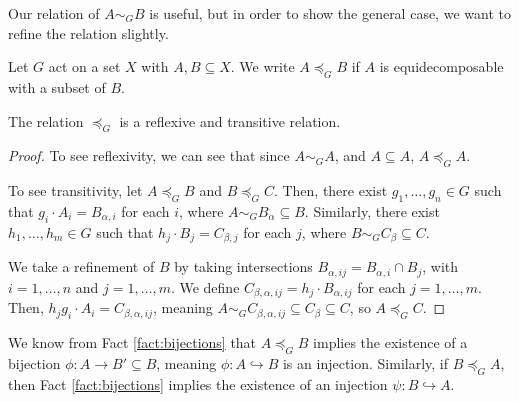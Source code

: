 Our relation of $A \sim_{G} B$ is useful, but in order to show the general case, we want to refine the relation slightly.
\begin{definition}
  Let $G$ act on a set $X$ with $A,B\subseteq X$. We write $A\preceq_{G}B$ if $A$ is equidecomposable with a subset of $B$.
\end{definition}
\begin{fact}\label{fact:preorder}
  The relation $\preceq_{G}$ is a reflexive and transitive relation.
\end{fact}
\begin{proof}
  To see reflexivity, we can see that since $A\sim_{G}A$, and $A\subseteq A$, $A\preceq_{G} A$.\newline

  To see transitivity, let $A\preceq_{G}B$ and $B\preceq_{G}C$. Then, there exist $g_1,\dots,g_n\in G$ such that $g_i\cdot A_i = B_{\alpha,i}$ for each $i$, where $A\sim_{G}B_{\alpha}\subseteq B$. Similarly, there exist $h_1,\dots,h_m\in G$ such that $h_j\cdot B_j= C_{\beta,j}$ for each $j$, where $B\sim_{G}C_{\beta}\subseteq C$.\newline

  We take a refinement of $B$ by taking intersections $B_{\alpha,ij} = B_{\alpha,i}\cap B_j$, with $i=1,\dots,n$ and $j = 1,\dots,m$. We define $C_{\beta,\alpha,ij} = h_j\cdot B_{\alpha,ij}$ for each $j = 1,\dots,m$. Then, $h_jg_i\cdot A_i = C_{\beta,\alpha,ij}$, meaning $A\sim_{G}C_{\beta,\alpha,ij}\subseteq C_{\beta}\subseteq C$, so $A\preceq_{G}C$.
\end{proof}

We know from Fact \ref{fact:bijections} that $A\preceq_{G}B$ implies the existence of a bijection $\phi: A\rightarrow B'\subseteq B$, meaning $\phi: A\hookrightarrow B$ is an injection. Similarly, if $B\preceq_{G}A$, then Fact \ref{fact:bijections} implies the existence of an injection $\psi: B\hookrightarrow A$.\newline

